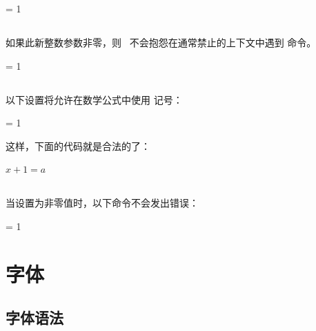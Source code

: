 \begin{typing}
\suppressifcsnameerror = 1
\end{typing}

\subsection{}


如果此新整数参数非零，则 \LUATEX\ 不会抱怨在通常禁止的上下文中遇到  命令。

\begin{typing}
\suppressoutererror = 1
\end{typing}

\subsection{}


以下设置将允许在数学公式中使用  记号：

\begin{typing}
\suppressmathparerror = 1
\end{typing}

这样，下面的代码就是合法的了：

\begin{typing}
$ x + 1 =

a $
\end{typing}

\subsection{}


当设置为非零值时，以下命令不会发出错误：

\begin{typing}
\suppressprimitiveerror = 1

\primitive\notaprimitive
\end{typing}

\section{字体}

\subsection{字体语法}

